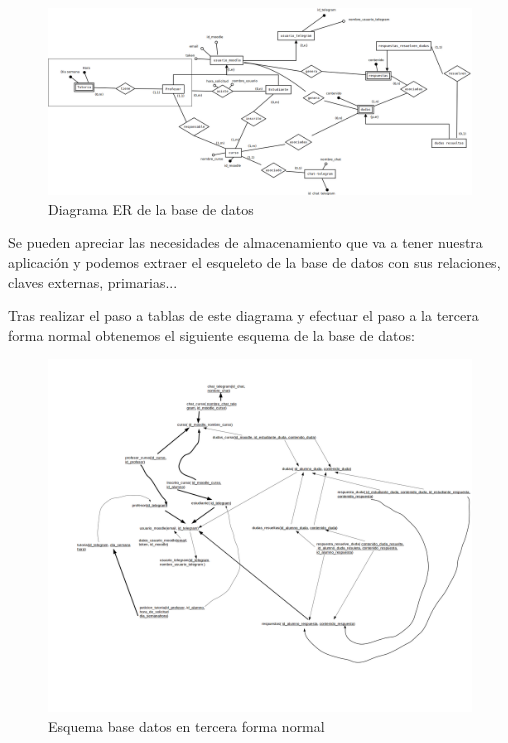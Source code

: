 \begin{figure}[H] %
\centering
\includegraphics[scale=0.2]{imagenes/diagramas/base_datos/ER.png}  %

\caption{Diagrama ER de la base de datos }\label{figura520}
\end{figure}
Se pueden apreciar las necesidades de almacenamiento que va a tener nuestra aplicación y podemos extraer el esqueleto de la base de datos con sus relaciones, claves externas, primarias... \par
Tras realizar el paso a tablas de este diagrama y efectuar el paso a la tercera forma normal obtenemos el siguiente esquema de la base de datos:


 \begin{figure}[H] %
\includegraphics[width=1.2\textwidth, right]{imagenes/diagramas/base_datos/esquema_tablas_normalizadafn3.png}  %
\caption{Esquema base datos en tercera forma normal}\label{figura5211}
\end{figure}



